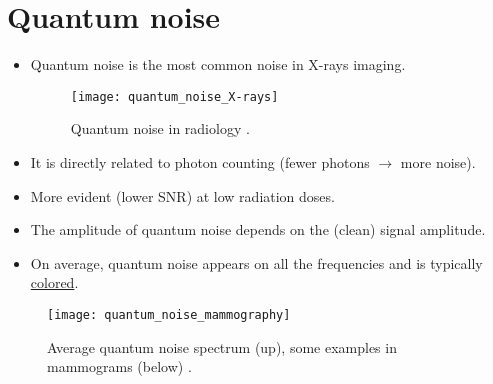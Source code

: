 \section{Quantum noise}
\label{sec:radiography_quantum_noise}
\begin{itemize}
\item Quantum noise is the most common noise in X-rays imaging.
\vspace{1ex}
\begin{figure}[H]
  \centering
    \texttt{[image: quantum\_noise\_X-rays]}
    \caption{Quantum noise in radiology
      \cite{CHANDRA2020107426}.\label{fig:quantum_noise_X-rays}}
\end{figure}
\item It is directly related to photon counting (fewer photons
  $\rightarrow$ more noise).
\item More evident (lower \gls{SNR}) at low radiation doses.
\item The amplitude of quantum noise depends on the (clean) signal amplitude.  
\newpage
\item On average, quantum noise appears on all the frequencies and is typically \href{https://en.wikipedia.org/wiki/Colors_of_noise}{colored}.
\end{itemize}
\vspace{-1ex}
\begin{figure}[H]
  \centering
    \texttt{[image: quantum\_noise\_mammography]}
    \caption{Average quantum noise spectrum (up), some examples in mammograms (below) 
      \cite{saunders2007does}.\label{fig:quantum_noise_X-rays_spectrum}}
\end{figure}

